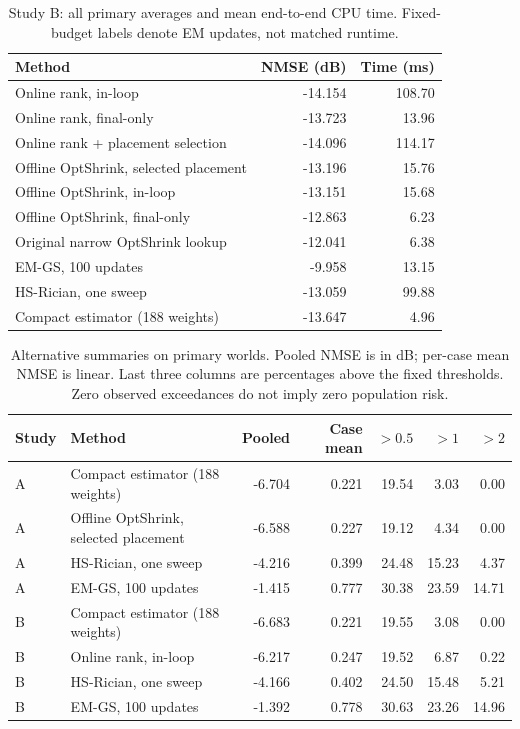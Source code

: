 \begin{table}[!t]
\caption{Study B: all primary averages and mean end-to-end CPU time. Fixed-budget labels denote EM updates, not matched runtime.}
\label{tab:all-B}\centering\footnotesize
\setlength{\tabcolsep}{4pt}
\begin{tabular}{@{}lrr@{}}\toprule
Method & NMSE (dB) & Time (ms)\\
\midrule
Online rank, in-loop & -14.154 & 108.70\\
Online rank, final-only & -13.723 & 13.96\\
Online rank + placement selection & -14.096 & 114.17\\
Offline OptShrink, selected placement & -13.196 & 15.76\\
Offline OptShrink, in-loop & -13.151 & 15.68\\
Offline OptShrink, final-only & -12.863 & 6.23\\
Original narrow OptShrink lookup & -12.041 & 6.38\\
EM-GS, 100 updates & -9.958 & 13.15\\
HS-Rician, one sweep & -13.059 & 99.88\\
Compact estimator (188 weights) & -13.647 & 4.96\\
\bottomrule
\end{tabular}
\end{table}


\begin{table}[!t]
\caption{Alternative summaries on primary worlds. Pooled NMSE is in dB; per-case mean NMSE is linear. Last three columns are percentages above the fixed thresholds. Zero observed exceedances do not imply zero population risk.}
\label{tab:broad-tails}\centering\footnotesize
\setlength{\tabcolsep}{4pt}
\begin{tabular}{@{}llrrrrr@{}}\toprule
Study & Method & Pooled & Case mean & $>0.5$ & $>1$ & $>2$\\
\midrule
A & Compact estimator (188 weights) & -6.704 & 0.221 & 19.54 & 3.03 & 0.00\\
A & Offline OptShrink, selected placement & -6.588 & 0.227 & 19.12 & 4.34 & 0.00\\
A & HS-Rician, one sweep & -4.216 & 0.399 & 24.48 & 15.23 & 4.37\\
A & EM-GS, 100 updates & -1.415 & 0.777 & 30.38 & 23.59 & 14.71\\
B & Compact estimator (188 weights) & -6.683 & 0.221 & 19.55 & 3.08 & 0.00\\
B & Online rank, in-loop & -6.217 & 0.247 & 19.52 & 6.87 & 0.22\\
B & HS-Rician, one sweep & -4.166 & 0.402 & 24.50 & 15.48 & 5.21\\
B & EM-GS, 100 updates & -1.392 & 0.778 & 30.63 & 23.26 & 14.96\\
\bottomrule
\end{tabular}
\end{table}


